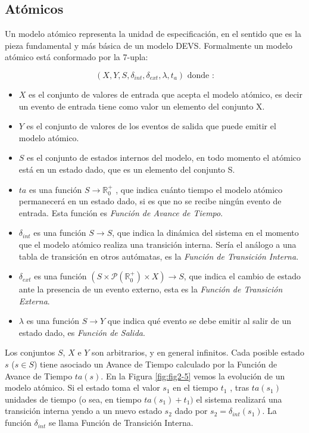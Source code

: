 	\subsection{Atómicos}
	Un modelo atómico representa la unidad  de especificación, en el sentido que es la pieza fundamental y más básica de un modelo DEVS. 
	Formalmente un modelo atómico está conformado por la 7-upla:

	\begin{equation} 
	(X, Y, S, \delta_{int} , \delta_{ext}, \lambda, t_{a}) \mbox{ donde :}
	\end{equation}

	\begin{itemize}
	\item $X$ es el conjunto de valores de entrada que acepta el modelo atómico, es decir un evento de entrada tiene como valor un elemento del conjunto X.
	\item $Y$ es el conjunto de valores de los eventos de salida que puede emitir el modelo atómico.
	\item $S$ es el conjunto de estados internos del modelo, en todo momento el atómico está en un estado dado, que es un elemento del conjunto S.
	\item $ta$ es una función $S \to \mathbb{R}^{+}_{0}$ , que indica cuánto tiempo el modelo atómico permanecerá en un estado dado, si es que no se recibe ningún 
	evento de entrada. Esta función es \emph{Función de Avance de Tiempo}.
	\item $\delta_{int}$ es una función $S \to S$, que indica la dinámica del sistema en el momento que el modelo atómico realiza una transición interna. 
	Sería el análogo a una tabla de transición en otros autómatas, es la \emph{Función de Transición Interna}.
	\item $\delta_{ext}$ es una función $(S \times \mathcal{P}(\mathbb{R}^{+}_{0}) \times X) \to S$, que indica el cambio de estado ante la presencia de un evento 
	externo, esta es la \emph{Función de Transición Externa}.
	\item $\lambda$ es una función $S \to Y$ que indica qué evento se debe emitir al salir de un estado dado, es \emph{Función de Salida}.
	\end{itemize}

	Los conjuntos $S$, $X$ e $Y$ son arbitrarios, y en general infinitos. Cada posible estado $s$ ($s \in S$) tiene asociado un Avance de Tiempo calculado 
	por la Función de Avance de Tiempo $ta(s)$.
	En la Figura \ref{fig:fig2-5} vemos la evolución de un modelo atómico. Si el estado toma el valor $s_1$ en el tiempo $t_1$ , tras $ta(s_1)$ unidades de 
	tiempo (o sea, en tiempo $ta(s_1 ) + t_1 )$ el sistema realizará una transición interna yendo a un nuevo estado $s_2$ dado por $s_2 = \delta_{int} (s_1 )$. 
	La función $\delta_{int}$ se llama Función de Transición Interna.

